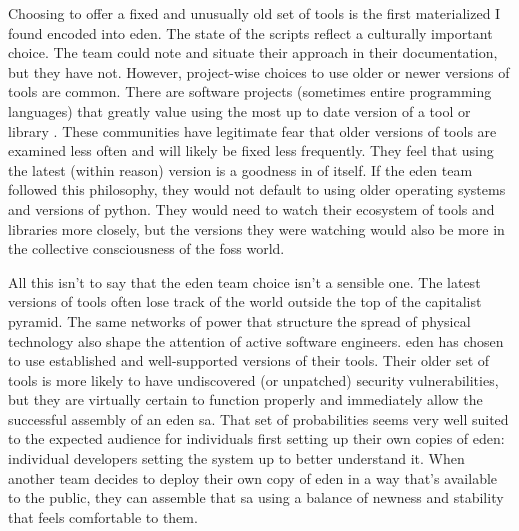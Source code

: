 \documentclass[a4paper,man,natbib]{apa6}
\begin{document}
   Choosing to offer a fixed and unusually old set of tools is the first materialized I found encoded into \acrshort{eden}. The state of the scripts reflect a culturally important choice. The team could note and situate their approach in their documentation, but they have not. However, project-wise choices to use older or newer versions of tools are common. There are software projects (sometimes entire programming languages) that greatly value using the most up to date version of a tool or library \citep{Fernandes_da_Costa2017-mh}. These communities have legitimate fear that older versions of tools are examined less often and will likely be fixed less frequently. They feel that using the latest (within reason) version is a goodness in of itself. If the \acrshort{eden} team followed this philosophy, they would not default to using older operating systems and versions of \gls{python}. They would need to watch their ecosystem of tools and libraries more closely, but the versions they were watching would also be more in the collective consciousness of the \acrshort{foss} world. 

   All this isn't to say that the \acrshort{eden} team choice isn't a sensible one. The latest versions of tools often lose track of the world outside the top of the capitalist pyramid. The same networks of power that structure the spread of physical technology also shape the attention of active software engineers. \acrshort{eden} has chosen to use established and well-supported versions of their tools. Their older set of tools is more likely to have undiscovered (or unpatched) security vulnerabilities, but they are virtually certain to function properly and immediately allow the successful assembly of an \acrshort{eden} \gls{sa}. That set of probabilities seems very well suited to the expected audience for individuals first setting up their own copies of \acrshort{eden}: individual developers setting the system up to better understand it. When another team decides to deploy their own copy of \acrshort{eden} in a way that's available to the public, they can assemble that \gls{sa} using a balance of newness and stability that feels comfortable to them. 
\end{document}
